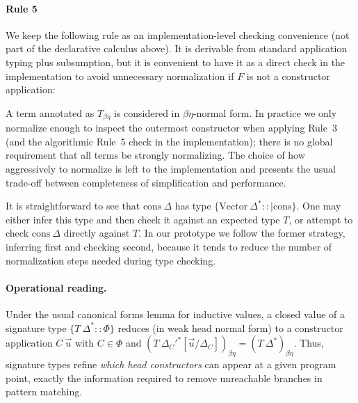 \documentclass[a4paper, anonymous, UKenglish,cleveref, autoref, thm-restate]{lipics-v2021}
\begin{document}
\paragraph*{Rule 5}
We keep the following rule as an implementation-level checking convenience (not part of the declarative calculus above). It is derivable from standard application typing plus subsumption, but it is convenient to have it as a direct check in the implementation to avoid unnecessary normalization if $F$ is not a constructor application:
\begin{mathpar}
\end{mathpar}

A term annotated as $T_{\beta\eta}$ is considered in $\beta\eta$-normal form. In practice we only normalize enough to inspect the outermost constructor when applying Rule~3 (and the algorithmic Rule~5 check in the implementation); there is no global requirement that all terms be strongly normalizing. The choice of how aggressively to normalize is left to the implementation and presents the usual trade-off between completeness of simplification and performance.

It is straightforward to see that $\text{cons}\:\Delta$ has type $\{\text{Vector}\:\Delta^* :: |\text{cons}\}$. One may either infer this type and then check it against an expected type $T$, or attempt to check $\text{cons}\:\Delta$ directly against $T$. In our prototype we follow the former strategy, inferring first and checking second, because it tends to reduce the number of normalization steps needed during type checking.

\paragraph*{Operational reading.}
Under the usual canonical forms lemma for inductive values, a closed value of a signature type $\{T\:\Delta^{*} :: \Phi\}$ reduces (in weak head normal form) to a constructor application $C\:\overrightarrow{u}$ with $C \in \Phi$ and $(T\:\Delta_{C}'^{*}[\overrightarrow{u}/\Delta_C])_{\beta\eta} = (T\:\Delta^{*})_{\beta\eta}$. Thus, signature types refine \emph{which head constructors} can appear at a given program point, exactly the information required to remove unreachable branches in pattern matching.
\end{document}

